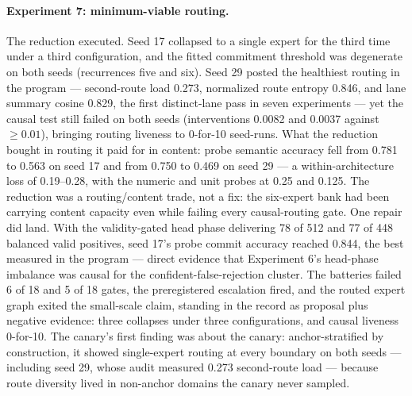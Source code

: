 \documentclass[10pt,a4paper]{article}
\begin{document}
\paragraph{Experiment 7: minimum-viable routing.}
The reduction executed. Seed 17 collapsed to a single expert for the third time under a third configuration, and the fitted commitment threshold was degenerate on both seeds (recurrences five and six). Seed 29 posted the healthiest routing in the program --- second-route load 0.273, normalized route entropy 0.846, and lane summary cosine 0.829, the first distinct-lane pass in seven experiments --- yet the causal test still failed on both seeds (interventions 0.0082 and 0.0037 against $\geq 0.01$), bringing routing liveness to 0-for-10 seed-runs. What the reduction bought in routing it paid for in content: probe semantic accuracy fell from 0.781 to 0.563 on seed 17 and from 0.750 to 0.469 on seed 29 --- a within-architecture loss of 0.19--0.28, with the numeric and unit probes at 0.25 and 0.125. The reduction was a routing/content trade, not a fix: the six-expert bank had been carrying content capacity even while failing every causal-routing gate. One repair did land. With the validity-gated head phase delivering 78 of 512 and 77 of 448 balanced valid positives, seed 17's probe commit accuracy reached 0.844, the best measured in the program --- direct evidence that Experiment 6's head-phase imbalance was causal for the confident-false-rejection cluster. The batteries failed 6 of 18 and 5 of 18 gates, the preregistered escalation fired, and the routed expert graph exited the small-scale claim, standing in the record as proposal plus negative evidence: three collapses under three configurations, and causal liveness 0-for-10. The canary's first finding was about the canary: anchor-stratified by construction, it showed single-expert routing at every boundary on both seeds --- including seed 29, whose audit measured 0.273 second-route load --- because route diversity lived in non-anchor domains the canary never sampled.
\end{document}
